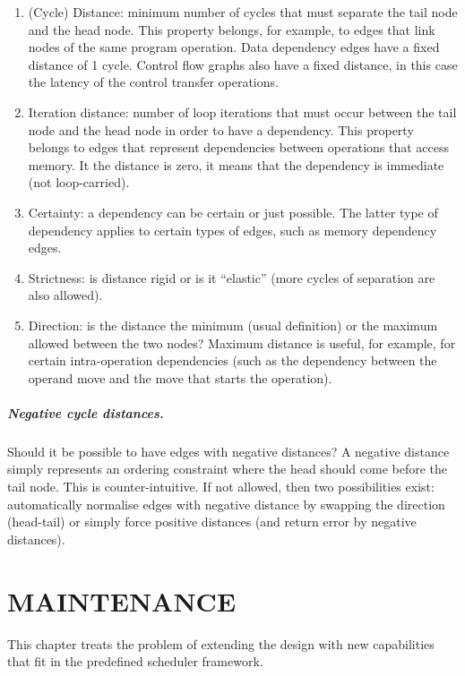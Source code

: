 \documentclass[a4paper,twoside]{tce}
\begin{document}
\begin{enumerate}
\item %
  (Cycle) Distance: minimum number of cycles that must separate the tail
  node and the head node. This property belongs, for example, to edges that
  link nodes of the same program operation. Data dependency edges have a
  fixed distance of 1 cycle. Control flow graphs also have a fixed distance,
  in this case the latency of the control transfer operations.
\item %
  Iteration distance: number of loop iterations that must occur between the
  tail node and the head node in order to have a dependency. This property
  belongs to edges that represent dependencies between operations that
  access memory. It the distance is zero, it means that the dependency is
  immediate (not loop-carried).
\item %
  Certainty: a dependency can be certain or just possible. The latter type
  of dependency applies to certain types of edges, such as memory
  dependency edges.
\item %
  Strictness: is distance rigid or is it ``elastic'' (more cycles of
  separation are also allowed).
\item %
  Direction: is the distance the minimum (usual definition) or the maximum
  allowed between the two nodes? Maximum distance is useful, for example,
  for certain intra-operation dependencies (such as the dependency between
  the operand move and the move that starts the operation).
\end{enumerate}

\paragraph{Negative cycle distances.}
Should it be possible to have edges with negative distances? A negative
distance simply represents an ordering constraint where the head should come
before the tail node. This is counter-intuitive. If not allowed, then two
possibilities exist: automatically normalise edges with negative distance by
swapping the direction (head-tail) or simply force positive distances (and
return error by negative distances).



\chapter{MAINTENANCE}

This chapter treats the problem of extending the design with new
capabilities that fit in the predefined scheduler framework.
\end{document}
